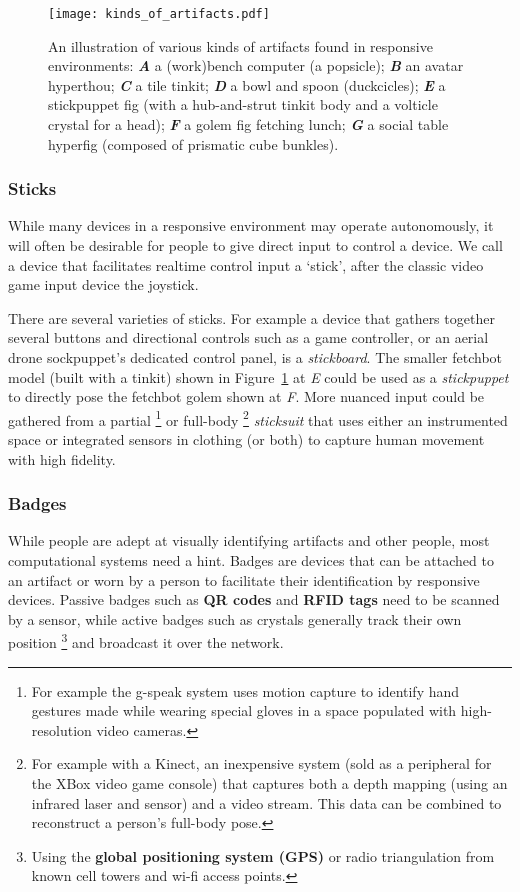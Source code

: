 \begin{figure}[]
  \centering
    \texttt{[image: kinds\_of\_artifacts.pdf]}
  \caption{An illustration of various kinds of artifacts found in responsive environments: \textbf{\emph{A}} a (work)bench computer (a popsicle); \textbf{\emph{B}} an avatar hyperthou; \textbf{\emph{C}} a tile tinkit; \textbf{\emph{D}} a bowl and spoon (duckcicles); \textbf{\emph{E}} a stickpuppet fig (with a hub-and-strut tinkit body and a volticle crystal for a head); \textbf{\emph{F}} a golem fig fetching lunch; \textbf{\emph{G}} a social table hyperfig (composed of prismatic cube bunkles).}
  \label{fig:kinds_of_artifacts}
\end{figure}

\subsubsection{Sticks}
While many devices in a responsive environment may operate autonomously, it will often be desirable for people to give direct input to control a device. 
We call a device that facilitates realtime control input a `stick', after the classic video game input device the joystick. 

There are several varieties of sticks. 
For example a device that gathers together several buttons and directional controls such as a game controller, or an aerial drone sockpuppet's dedicated control panel, is a \emph{stickboard}. 
The smaller fetchbot model (built with a tinkit) shown in Figure~\ref{fig:kinds_of_artifacts} at \emph{E} could be used as a \emph{stickpuppet} to directly pose the fetchbot golem shown at \emph{F}. 
More nuanced input could be gathered from a partial%
\footnote{For example the g-speak system \citep{gstalt} uses motion capture to identify hand gestures made while wearing special gloves in a space populated with high-resolution video cameras.}
or full-body%
\footnote{For example with a Kinect, an inexpensive system (sold as a peripheral for the XBox video game console) that captures both a depth mapping (using an infrared laser and sensor) and a video stream. This data can be combined to reconstruct a person's full-body pose.}
\emph{sticksuit} that uses either an instrumented space or integrated sensors in clothing (or both) to capture human movement with high fidelity.

\subsubsection{Badges}
While people are adept at visually identifying artifacts and other people, most computational systems need a hint. Badges are devices that can be attached to an artifact or worn by a person to facilitate their identification by responsive devices. Passive badges such as \textbf{QR codes} and \textbf{RFID tags} need to be scanned by a sensor, while active badges such as crystals generally track their own position%
\footnote{Using the \textbf{global positioning system (GPS)} or radio triangulation from known cell towers and wi-fi access points.}
and broadcast it over the network.


